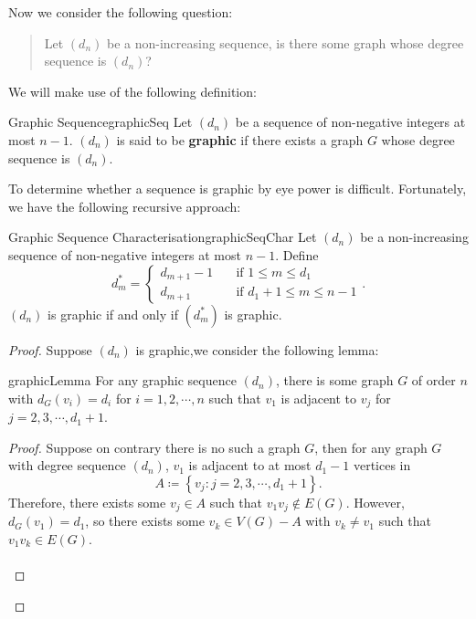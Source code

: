 \documentclass[math]{amznotes}
\theoremstyle{remark}
\begin{document}
Now we consider the following question:
\begin{quote}
    Let $(d_n)$ be a non-increasing sequence, is there some graph whose degree sequence is $(d_n)$?
\end{quote}
We will make use of the following definition:
\begin{dfnbox}{Graphic Sequence}{graphicSeq}
    Let $(d_n)$ be a sequence of non-negative integers at most $n - 1$. $(d_n)$ is said to be {\color{red} \textbf{graphic}} if there exists a graph $G$ whose degree sequence is $(d_n)$.
\end{dfnbox}
To determine whether a sequence is graphic by eye power is difficult. Fortunately, we have the following recursive approach:
\begin{thmbox}{Graphic Sequence Characterisation}{graphicSeqChar}
    Let $(d_n)$ be a non-increasing sequence of non-negative integers at most $n - 1$. Define
    \begin{equation*}
        d^*_m = \begin{cases}
            d_{m + 1} - 1 & \quad\textrm{if } 1 \leq m \leq d_1 \\
            d_{m + 1} & \quad\textrm{if } d_1 + 1 \leq m \leq n - 1
        \end{cases}.
    \end{equation*}
    $(d_n)$ is graphic if and only if $\left(d^*_m\right)$ is graphic.
    \tcblower
    \begin{proof}
        Suppose $(d_n)$ is graphic,we consider the following lemma:
        \begin{lembox}{}{graphicLemma}
            For any graphic sequence $(d_n)$, there is some graph $G$ of order $n$ with $d_G(v_i) = d_i$ for $i = 1, 2, \cdots, n$ such that $v_1$ is adjacent to $v_j$ for $j = 2, 3, \cdots, d_1 + 1$.
            \tcblower
            \begin{proof}
                Suppose on contrary there is no such a graph $G$, then for any graph $G$ with degree sequence $(d_n)$, $v_1$ is adjacent to at most $d_1 - 1$ vertices in
                \begin{equation*}
                    A \coloneqq \left\{v_j \colon j = 2, 3, \cdots, d_1 + 1\right\}.
                \end{equation*}
                Therefore, there exists some $v_j \in A$ such that $v_1v_j \notin E(G)$. However, $d_G(v_1) = d_1$, so there exists some $v_k \in V(G) - A$ with $v_k \neq v_1$ such that $v_1v_k \in E(G)$.
                \\\\

\end{proof}
\end{lembox}
\end{proof}
\end{thmbox}
\end{document}
